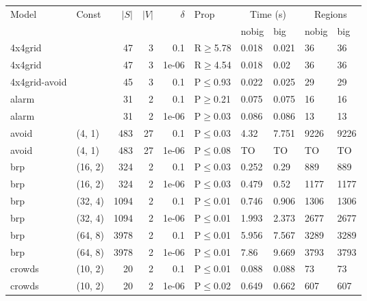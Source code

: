 \begin{longtable}{llrrrlllll}

        \toprule
        Model & Const & $|S|$ & $|V|$ & $\delta$ & Prop & \multicolumn{2}{c}{Time (s)} & \multicolumn{2}{c}{Regions} \\
        \cmidrule(ll){7-8} \cmidrule(ll){9-10}
        & & & & & & nobig & big & nobig & big \\
        \midrule
        
 4x4grid       &           &     	47 &   3 & 0.1   & R$\geq$5.78  & 0.018  & 0.021   & 36      & 36      \\
 4x4grid       &           &     	47 &   3 & 1e-06 & R$\geq$4.54  & 0.018  & 0.02    & 36      & 36      \\
 4x4grid-avoid &           &     	45 &   3 & 0.1   & P$\leq$0.93  & 0.022  & 0.025   & 29      & 29      \\
 alarm         &           &     	31 &   2 & 0.1   & P$\geq$0.21  & 0.075  & 0.075   & 16      & 16      \\
 alarm         &           &     	31 &   2 & 1e-06 & P$\geq$0.03  & 0.086  & 0.086   & 13      & 13      \\
 avoid         & (4, 1)    &    	483 &  27 & 0.1   & P$\leq$0.03  & 4.32   & 7.751   & 9226    & 9226    \\
 avoid         & (4, 1)    &    	483 &  27 & 1e-06 & P$\leq$0.08  & TO     & TO      & TO      & TO      \\
 brp           & (16, 2)   &    	324 &   2 & 0.1   & P$\leq$0.03  & 0.252  & 0.29    & 889     & 889     \\
 brp           & (16, 2)   &    	324 &   2 & 1e-06 & P$\leq$0.03  & 0.479  & 0.52    & 1177    & 1177    \\
 brp           & (32, 4)   &   	1094 &   2 & 0.1   & P$\leq$0.01  & 0.746  & 0.906   & 1306    & 1306    \\
 brp           & (32, 4)   &   	1094 &   2 & 1e-06 & P$\leq$0.01  & 1.993  & 2.373   & 2677    & 2677    \\
 brp           & (64, 8)   &   	3978 &   2 & 0.1   & P$\leq$0.01  & 5.956  & 7.567   & 3289    & 3289    \\
 brp           & (64, 8)   &   	3978 &   2 & 1e-06 & P$\leq$0.01  & 7.86   & 9.669   & 3793    & 3793    \\
 crowds        & (10, 2)   &     	20 &   2 & 0.1   & P$\leq$0.01  & 0.088  & 0.088   & 73      & 73      \\
 crowds        & (10, 2)   &     	20 &   2 & 1e-06 & P$\leq$0.02  & 0.649  & 0.662   & 607     & 607     \\

\end{longtable}
